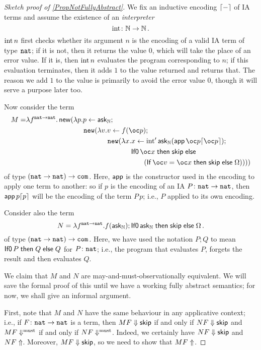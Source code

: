 \documentclass[11pt]{report}
\begin{document}
\begin{proof}[Sketch proof of \ref{PropNotFullyAbstract}]
  We fix an inductive encoding $\lceil-\rceil$ of IA terms and assume the existence of an \emph{interpreter}
  \[
    \operatorname{int} \colon \mathbb{N} \to \mathbb{N}\,.
    \]
  $\operatorname{int} n$ first checks whether its argument $n$ is the encoding of a valid IA term of type ${\mathtt{nat}}$; if it is not, then it returns the value $0$, which will take the place of an error value.
  If it is, then $\operatorname{int} n$ evaluates the program corresponding to $n$; if this evaluation terminates, then it adds $1$ to the value returned and returns that.  
  The reason we add $1$ to the value is primarily to avoid the error value $0$, though it will serve a purpose later too.

  Now consider the term
  \setlength{\jot}{0pt}%
  \begin{align*}
    M=&\lambda f^{\nat \to \nat} .\neww(\lambda p.p\gets\ask_\bN;\\
      &\hspace{82pt}\new(\lambda v.v\gets f(\oc p);\\
        &\hspace{116pt}\new(\lambda x.x\gets \Int' \ask_\bN (\app \oc p \encode {\oc p});\\
          &\hspace{148pt}\IfO \oc x \Then \skipp \Else\\
            &\hspace{168pt}(\If \oc v = \oc x \Then \skipp \Else \Omega))))
  \end{align*}
  of type $({\mathtt{nat}}\to {\mathtt{nat}}) \to {\mathtt{com}}$.
  Here, $\operatorname{\mathsf{app}}$ is the constructor used in the encoding to apply one term to another: so if $p$ is the encoding of an IA $P\colon {\mathtt{nat}} \to {\mathtt{nat}}$, then $\operatorname{\mathsf{app}} p \lceil p\rceil$ will be the encoding of the term $P\,p$; i.e., $P$ applied to its own encoding.

  Consider also the term
  \[
    N = \lambda f^{{\mathtt{nat}} \to {\mathtt{nat}}}.f(\operatorname{{\mathsf{ask}}}_{\mathbb{N}});\operatorname{{\mathsf{If0}}} \operatorname{{\mathsf{ask}}}_{\mathbb{N}} \mathrel{\mathsf{then}} {\mathsf{skip}} \mathrel{\mathsf{else}} \Omega\,.
    \]
  of type $({\mathtt{nat}} \to {\mathtt{nat}}) \to {\mathtt{com}}$.  
  Here, we have used the notation $P;Q$ to mean $\operatorname{{\mathsf{If0}}} P \mathrel{\mathsf{then}} Q \mathrel{\mathsf{else}} Q$ for $P\colon {\mathtt{nat}}$; i.e., the program that evaluates $P$, forgets the result and then evaluates $Q$.

  We claim that $M$ and $N$ are may-and-must-observationally equivalent.  
  We will save the formal proof of this until we have a working fully abstract semantics; for now, we shall give an informal argument.  

  First, note that $M$ and $N$ have the same behaviour in any applicative context; i.e., if $F\colon {\mathtt{nat}} \to {\mathtt{nat}}$ is a term, then $MF\Downarrow {\mathsf{skip}}$ if and only if $NF\Downarrow{\mathsf{skip}}$ and $MF\Downarrow^{\text{must}}$ if and only if $NF\Downarrow^{\text{must}}$.  
  Indeed, we certainly have $NF\Downarrow{\mathsf{skip}}$ and $NF\Uparrow$.
  Moreover, $MF\Downarrow{\mathsf{skip}}$, so we need to show that $MF\Uparrow$.


\end{proof}
\end{document}

